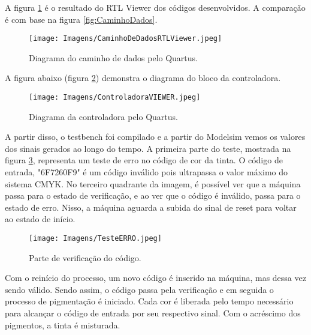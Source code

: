 \documentclass[12pt,a4paper,oneside]{abntex2}
\begin{document}
            A figura \ref{fig:CaminhoDeDadosRTLViewer} é o resultado do RTL Viewer dos códigos desenvolvidos. A comparação é com base na figura \ref{fig:CaminhoDados}.

            \begin{figure}[H]
                \centering
                \texttt{[image: Imagens/CaminhoDeDadosRTLViewer.jpeg]}
                \caption{Diagrama do caminho de dados pelo Quartus.}
                \label{fig:CaminhoDeDadosRTLViewer}
            \end{figure}

            A figura abaixo (figura \ref{fig:ControladoraVIEWER}) demonstra o diagrama do bloco da controladora.

            \begin{figure}[H]
                \centering
                \texttt{[image: Imagens/ControladoraVIEWER.jpeg]}
                \caption{Diagrama da controladora pelo Quartus.}
                \label{fig:ControladoraVIEWER}
            \end{figure}

            A partir disso, o testbench foi compilado e a partir do Modelsim vemos os valores dos sinais gerados ao longo do tempo. A primeira parte do teste, mostrada na figura \ref{fig:TesteUm}, representa um teste de erro no código de cor da tinta. O código de entrada, "6F7260F9"  é um código inválido pois ultrapassa o valor máximo do sistema CMYK. No terceiro quadrante da imagem, é possível ver que a máquina passa para o estado de verificação, e ao ver que o código é inválido, passa para o estado de erro. Nisso, a máquina aguarda a subida do sinal de reset para voltar ao estado de início.
            
            \begin{figure}[H]
                \centering
                \texttt{[image: Imagens/TesteERRO.jpeg]}
                \caption{Parte de verificação do código.}
                \label{fig:TesteUm}
            \end{figure}

            Com o reinício do processo, um novo código é inserido na máquina, mas dessa vez sendo válido. Sendo assim, o código passa pela verificação e em seguida o processo de pigmentação é iniciado. Cada cor é liberada pelo tempo necessário para alcançar o código de entrada por seu respectivo sinal. Com o acréscimo dos pigmentos, a tinta é misturada.
\end{document}
